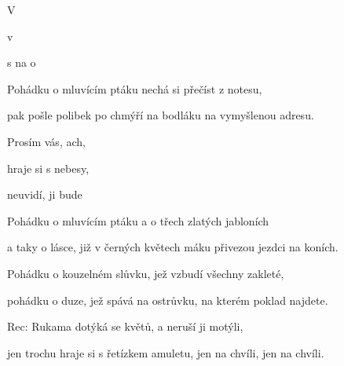 

\zs
V    

 v  

   

 s  na o
\ks

\zs
Pohádku o mluvícím ptáku nechá si přečíst z notesu,

pak pošle polibek po chmýří na bodláku na vymyšlenou adresu.
\ks

\zr
Prosím vás,  ach, 

 

  

 hraje si  s nebesy,

 neuvidí,  ji bude 
\kr

\zs
Pohádku o mluvícím ptáku a o třech zlatých jabloních

a taky o lásce, již v černých květech máku přivezou jezdci na koních.
\ks

\zs
Pohádku o kouzelném slůvku, jež vzbudí všechny zakleté,

pohádku o duze, jež spává na ostrůvku, na kterém poklad najdete.
\ks

\zr\kr

\zs
Rec: Rukama dotýká se květů, a neruší ji motýli,

jen trochu hraje si s řetízkem amuletu, jen na chvíli, jen na chvíli.
\ks

\zr\kr

\kp
